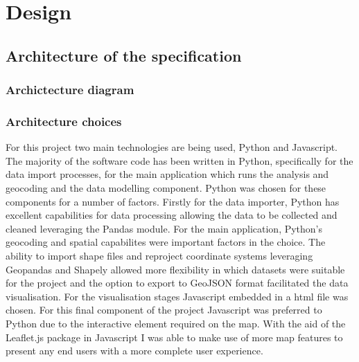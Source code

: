 
\chapter{Design} %

\label{Chapter4} %


\section{Architecture of the specification}

\subsection{Archictecture diagram}



\subsection{Architecture choices}
For this project two main technologies are being used, Python and Javascript. The majority of the software code has been written in Python, specifically for the data import processes, for the main application which runs the analysis and geocoding and the data modelling component. Python was chosen for these components for a number of factors. Firstly for the data importer, Python has excellent capabilities for data processing allowing the data to be collected and cleaned leveraging the Pandas module. For the main application, Python's geocoding and spatial capabilites were important factors in the choice. The ability to import shape files and reproject coordinate systems leveraging Geopandas and Shapely allowed more flexibility in which datasets were suitable for the project and the option to export to GeoJSON format facilitated the data visualisation.
For the visualisation stages Javascript embedded in a html file was chosen. For this final component of the project Javascript was preferred to Python due to the interactive element required on the map. With the aid of the Leaflet.js package in Javascript I was able to make use of more map features to present any end users with a more complete user experience.


